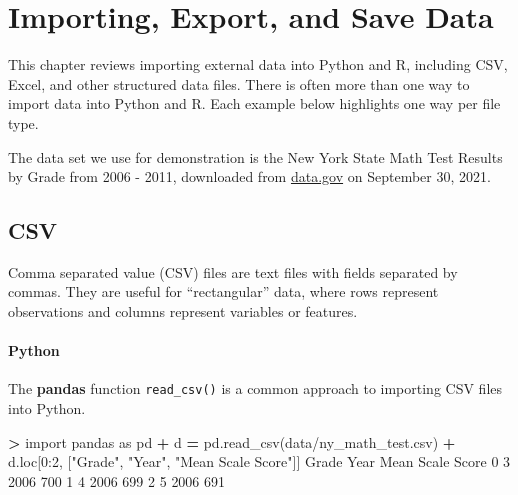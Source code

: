 \documentclass[
]{book}
\newenvironment{Shaded}{\begin{snugshade}}{\end{snugshade}}
\newcommand{\DecValTok}[1]{\textcolor[rgb]{0.00,0.00,0.81}{#1}}
\newcommand{\ImportTok}[1]{#1}
\newcommand{\NormalTok}[1]{#1}
\newcommand{\OperatorTok}[1]{\textcolor[rgb]{0.81,0.36,0.00}{\textbf{#1}}}
\newcommand{\StringTok}[1]{\textcolor[rgb]{0.31,0.60,0.02}{#1}}
\begin{document}
\hypertarget{importing-export-and-save-data}{%
\chapter{Importing, Export, and Save Data}\label{importing-export-and-save-data}}

This chapter reviews importing external data into Python and R, including CSV, Excel, and other structured data files. There is often more than one way to import data into Python and R. Each example below highlights one way per file type.

The data set we use for demonstration is the New York State Math Test Results by Grade from 2006 - 2011, downloaded from \href{https://catalog.data.gov/dataset/2006-2011-nys-math-test-results-by-grade-citywide-by-race-ethnicity}{data.gov} on September 30, 2021.

\hypertarget{csv}{%
\section{CSV}\label{csv}}

Comma separated value (CSV) files are text files with fields separated by commas. They are useful for ``rectangular'' data, where rows represent observations and columns represent variables or features.

\hypertarget{python-12}{%
\subsubsection*{Python}\label{python-12}}

The \textbf{pandas} function \texttt{read\_csv()} is a common approach to importing CSV files into Python.

\begin{Shaded}
\begin{Highlighting}[]
\OperatorTok{\textgreater{}} \ImportTok{import}\NormalTok{ pandas }\ImportTok{as}\NormalTok{ pd}
\OperatorTok{+}\NormalTok{ d }\OperatorTok{=}\NormalTok{ pd.read\_csv(}\StringTok{\textquotesingle{}data/ny\_math\_test.csv\textquotesingle{}}\NormalTok{)}
\OperatorTok{+}\NormalTok{ d.loc[}\DecValTok{0}\NormalTok{:}\DecValTok{2}\NormalTok{, [}\StringTok{"Grade"}\NormalTok{, }\StringTok{"Year"}\NormalTok{, }\StringTok{"Mean Scale Score"}\NormalTok{]]}
\NormalTok{  Grade  Year  Mean Scale Score}
\DecValTok{0}     \DecValTok{3}  \DecValTok{2006}               \DecValTok{700}
\DecValTok{1}     \DecValTok{4}  \DecValTok{2006}               \DecValTok{699}
\DecValTok{2}     \DecValTok{5}  \DecValTok{2006}               \DecValTok{691}
\end{Highlighting}
\end{Shaded}
\end{document}
